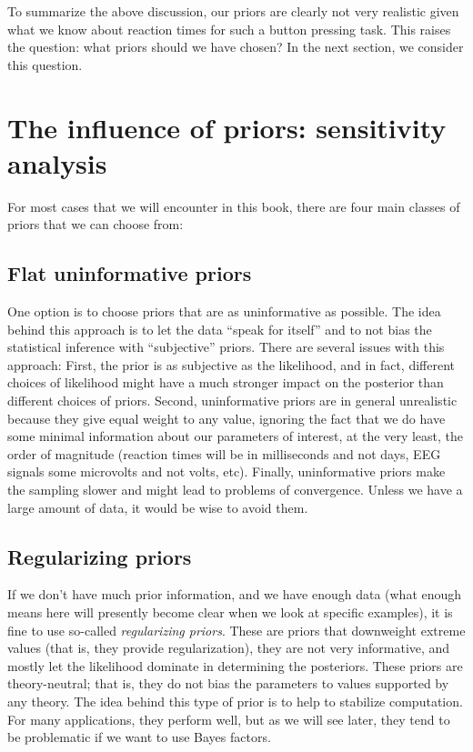 \documentclass[12pt,]{krantz}
\theoremstyle{definition}
\theoremstyle{definition}
\theoremstyle{definition}
\theoremstyle{remark}
\begin{document}
To summarize the above discussion, our priors are clearly not very realistic given what we know about reaction times for such a button pressing task. This raises the question: what priors should we have chosen? In the next section, we consider this question.

\hypertarget{sec:sensitivity}{%
\section{The influence of priors: sensitivity analysis}\label{sec:sensitivity}}

For most cases that we will encounter in this book, there are four main classes of priors that we can choose from:

\hypertarget{flat-uninformative-priors}{%
\subsection{Flat uninformative priors}\label{flat-uninformative-priors}}

One option is to choose priors that are as uninformative as possible. The idea behind this approach is to let the data ``speak for itself'' and to not bias the statistical inference with ``subjective'' priors. There are several issues with this approach: First, the prior is as subjective as the likelihood, and in fact, different choices of likelihood might have a much stronger impact on the posterior than different choices of priors. Second, uninformative priors are in general unrealistic because they give equal weight to any value, ignoring the fact that we do have some minimal information about our parameters of interest, at the very least, the order of magnitude (reaction times will be in milliseconds and not days, EEG signals some microvolts and not volts, etc). Finally, uninformative priors make the sampling slower and might lead to problems of convergence. Unless we have a large amount of data, it would be wise to avoid them.

\hypertarget{regularizing-priors}{%
\subsection{Regularizing priors}\label{regularizing-priors}}

If we don't have much prior information, and we have enough data (what enough means here will presently become clear when we look at specific examples), it is fine to use so-called \emph{regularizing priors}. These are priors that downweight extreme values (that is, they provide regularization), they are not very informative, and mostly let the likelihood dominate in determining the posteriors. These priors are theory-neutral; that is, they do not bias the parameters to values supported by any theory. The idea behind this type of prior is to help to stabilize computation. For many applications, they perform well, but as we will see later, they tend to be problematic if we want to use Bayes factors.
\end{document}
